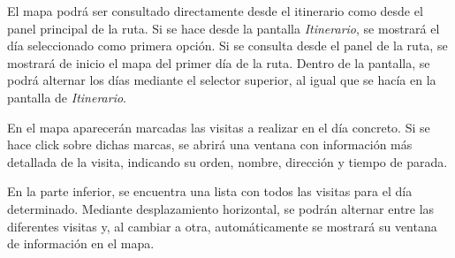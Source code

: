 
El mapa podrá ser consultado directamente desde el itinerario como desde el panel principal de la ruta. Si se hace desde la pantalla \textit{Itinerario}, se mostrará el día seleccionado como primera opción. Si se consulta desde el panel de la ruta, se mostrará de inicio el mapa del primer día de la ruta. Dentro de la pantalla, se podrá alternar los días mediante el selector superior, al igual que se hacía en la pantalla de \textit{Itinerario}.
	
	En el mapa aparecerán marcadas las visitas a realizar en el día concreto. Si se hace click sobre dichas marcas, se abrirá una ventana con información más detallada de la visita, indicando su orden, nombre, dirección y tiempo de parada.
	
	En la parte inferior, se encuentra una lista con todos las visitas para el día determinado. Mediante desplazamiento horizontal, se podrán alternar entre las diferentes visitas y, al cambiar a otra, automáticamente se mostrará su ventana de información en el mapa.
	
